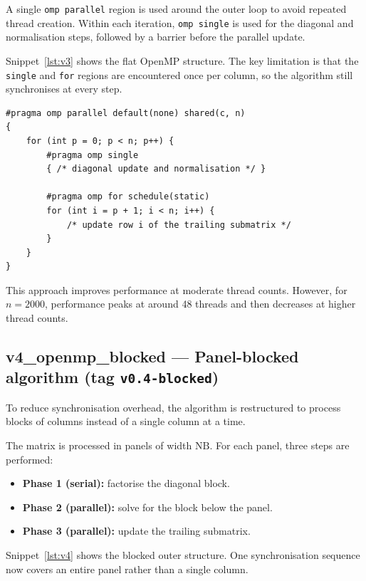 \documentclass{article}
\newcommand{\snippetspace}{\Needspace{16\baselineskip}}
\begin{document}
A single \texttt{omp parallel} region is used around the outer loop to avoid
repeated thread creation. Within each iteration, \texttt{omp single} is used
for the diagonal and normalisation steps, followed by a barrier before the
parallel update.

\snippetspace
Snippet~\ref{lst:v3} shows the flat OpenMP structure. The key limitation is
that the \texttt{single} and \texttt{for} regions are encountered once per
column, so the algorithm still synchronises at every step.

\begin{lstlisting}[style=code,caption={Flat OpenMP structure in v3.},label={lst:v3}]
#pragma omp parallel default(none) shared(c, n)
{
    for (int p = 0; p < n; p++) {
        #pragma omp single
        { /* diagonal update and normalisation */ }

        #pragma omp for schedule(static)
        for (int i = p + 1; i < n; i++) {
            /* update row i of the trailing submatrix */
        }
    }
}
\end{lstlisting}

This approach improves performance at moderate thread counts. However, for
$n=2000$, performance peaks at around 48 threads and then decreases at higher
thread counts.

\subsection{v4\_openmp\_blocked --- Panel-blocked algorithm (tag \texttt{v0.4-blocked})}

To reduce synchronisation overhead, the algorithm is restructured to process
blocks of columns instead of a single column at a time.

The matrix is processed in panels of width $\mathrm{NB}$. For each panel,
three steps are performed:

\begin{itemize}
  \item \textbf{Phase 1 (serial):} factorise the diagonal block.
  \item \textbf{Phase 2 (parallel):} solve for the block below the panel.
  \item \textbf{Phase 3 (parallel):} update the trailing submatrix.
\end{itemize}

\snippetspace
Snippet~\ref{lst:v4} shows the blocked outer structure. One synchronisation
sequence now covers an entire panel rather than a single column.
\end{document}
